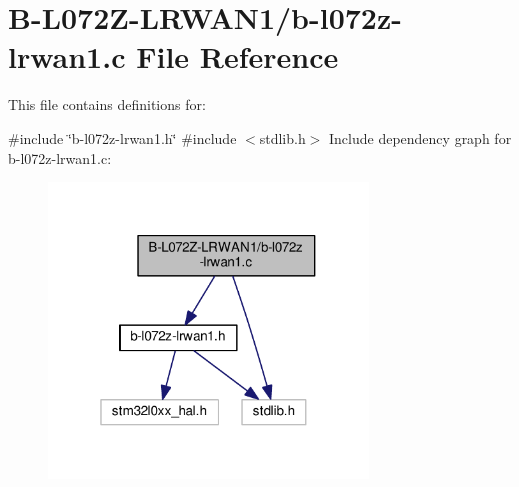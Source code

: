 \hypertarget{b-l072z-lrwan1_8c}{}\section{B-\/\+L072\+Z-\/\+L\+R\+W\+A\+N1/b-\/l072z-\/lrwan1.c File Reference}
\label{b-l072z-lrwan1_8c}


This file contains definitions for\+:  


{\ttfamily \#include \char`\"{}b-\/l072z-\/lrwan1.\+h\char`\"{}}\newline
{\ttfamily \#include $<$stdlib.\+h$>$}\newline
Include dependency graph for b-\/l072z-\/lrwan1.c\+:
\nopagebreak
\begin{figure}[H]
\begin{center}
\leavevmode
\includegraphics[width=241pt]{b-l072z-lrwan1_8c__incl}
\end{center}
\end{figure}
